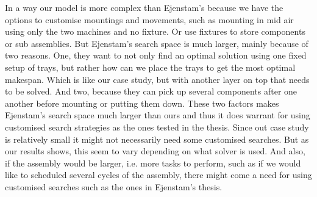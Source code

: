 In a way our model is more complex than Ejenstam's because we have the options to customise mountings and movements, such as mounting in mid air using only the two machines and no fixture. Or use fixtures to store components or sub assemblies. But Ejenstam's search space is much larger, mainly because of two reasons. One, they want to not only find an optimal solution using one fixed setup of trays, but rather how can we place the trays to get the most optimal makespan. Which is like our case study, but with another layer on top that needs to be solved. And two, because they can pick up several components after one another before mounting or putting them down. These two factors makes Ejenstam's search space much larger than ours and thus it does warrant for using customised search strategies as the ones tested in the thesis. Since out case study is relatively small it might not necessarily need some customised searches. But as our results shows, this seem to vary depending on what solver is used. And also, if the assembly would be larger, i.e. more tasks to perform, such as if we would like to scheduled several cycles of the assembly, there might come a need for using customised searches such as the ones in Ejenstam's thesis.

